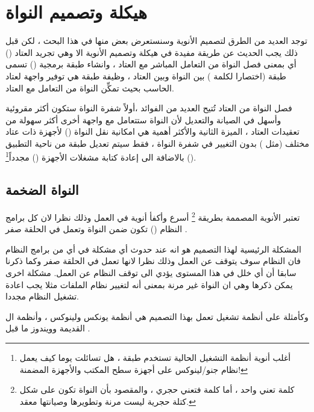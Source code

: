 \documentclass[document.tex]{subfiles}
\begin{document}
\section{هيكلة وتصميم النواة}
توجد العديد من الطرق لتصميم الأنوية وسنستعرض بعض منها في هذا البحث ، لكن قبل ذلك يجب الحديث عن طريقة مفيدة في هيكلة وتصميم الأنوية الا وهي تجريد العتاد () أي بمعنى فصل النواة من التعامل المباشر مع العتاد ، وانشاء طبقة برمجية () تسمى طبقة  (اختصارا لكلمة ) بين النواة وبين العتاد ، وظيفة طبقة  هي توفير واجهة لعتاد الحاسب بحيث تمكِّن النواة من التعامل مع العتاد.


فصل النواة من العتاد تُتيح العديد من الفوائد ،أولاً شفرة النواة ستكون أكثر مقروئية وأسهل في الصيانة والتعديل لأن النواة ستتعامل مع واجهة أخرى أكثر سهولة من تعقيدات العتاد ، الميزة الثانية والأكثر أهمية هي امكانية نقل النواة () لأجهزة ذات عتاد مختلف (مثل ) بدون التغيير في شفرة النواة ، فقط سيتم تعديل طبقة  من ناحية التطبيق () بالاضافة الى إعادة كتابة مشغلات الأجهزة () مجدداً\footnote{أغلب أنوية أنظمة التشغيل الحالية تستخدم طبقة ، هل تسائلت يوما كيف يعمل نظام جنو/لينوكس على أجهزة سطح المكتب والأجهزة المضمنة!}.

\subsection{النواة الضخمة }
تعتبر الأنوية المصممة بطريقة \footnote{كلمة  تعني واحد ، أما كلمة  فتعني حجري ، والمقصود بأن النواة تكون على شكل كتلة حجرية ليست مرنة وتطويرها وصيانتها معقد.} أسرع وأكفأ أنوية في العمل وذلك نظرا لان كل برامج النظام () تكون ضمن النواة وتعمل في الحلقة صفر .%


المشكلة الرئيسية لهذا التصميم هو انه عند حدوث أي مشكلة في أي من برامج النظام فان النظام سوف يتوقف عن العمل وذلك نظرا لانها تعمل في الحلقة صفر وكما ذكرنا سابقا أن أي خلل في هذا المستوى يؤدي الى توقف النظام عن العمل. مشكلة اخرى يمكن ذكرها وهي ان النواة غير مرنة بمعنى أنه لتغيير نظام الملفات مثلا يجب اعادة تشغيل النظام مجددا.

وكأمثلة على أنظمة تشغيل تعمل بهذا التصميم هي أنظمة يونكس ولينوكس ، وأنظمة ال  القديمة وويندوز  ما قبل .
\end{document}
